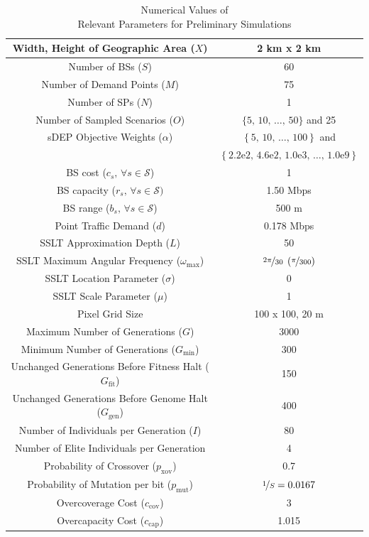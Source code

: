 \documentclass[12pt,dvipsnames]{report}
\newcommand{\expnumber}[2]{{#1}\mathrm{e}{#2}}
\begin{document}
\begin{table}[htp]
\centering
\caption{Numerical Values of\\Relevant Parameters for Preliminary Simulations}
\begin{tabular}{|c|c|} 
\hline
Width, Height of Geographic Area ($X$) & 2 km x 2 km \\
\hline
Number of BSs ($S$) & 60 \\ 
\hline 
Number of Demand Points ($M$) & 75 \\ 
\hline 
Number of SPs ($N$) & 1 \\
\hline
Number of Sampled Scenarios ($O$) & $\{5,\, 10,\, \ldots,\, 50\}$ and 25 \\ 
\hline 
sDEP Objective Weights ($\alpha$) & $\left\{ 5,\, 10,\, \ldots,\, 100 \right\}$ and \\
& $\left\{ \expnumber{2.2}{2},\, \expnumber{4.6}{2},\, \expnumber{1.0}{3},\, \ldots,\, \expnumber{1.0}{9} \right\}$ \\
\hline
BS cost ($c_s,\, \forall s \in \mathcal{S}$) & 1 \\ 
\hline 
BS capacity ($r_s,\, \forall s \in \mathcal{S})$ & 1.50 Mbps \\ 
\hline
BS range ($b_s,\, \forall s \in \mathcal{S}$) & 500 m \\
\hline 
Point Traffic Demand ($d$) & 0.178 Mbps \\ 
\hline 
\hline
SSLT Approximation Depth ($L$) & 50 \\ 
\hline
SSLT Maximum Angular Frequency ($\omega_{\max}$) & $\nicefrac{2 \pi}{30} \; \left( \nicefrac{\pi}{300} \right)$ \\
\hline 
SSLT Location Parameter ($\sigma$) & 0 \\ 
\hline 
SSLT Scale Parameter ($\mu$) & 1 \\ 
\hline
Pixel Grid Size & 100 x 100, 20 m \\
\hline 
\hline
Maximum Number of Generations ($G$) & 3000 \\ 
\hline
Minimum Number of Generations ($G_{\min}$) & 300 \\
\hline
Unchanged Generations Before Fitness Halt ($G_{\text{fit}}$) & 150 \\
\hline 
Unchanged Generations Before Genome Halt ($G_{\text{gen}}$) & 400 \\
\hline 
Number of Individuals per Generation ($I$) & 80 \\ 
\hline
Number of Elite Individuals per Generation & 4 \\
\hline 
Probability of Crossover ($p_\text{xov}$) & 0.7 \\ 
\hline
Probability of Mutation per bit ($p_\text{mut}$) & $\nicefrac{1}{S} = 0.0167$ \\
\hline 
Overcoverage Cost ($c_\text{cov}$) & 3 \\
\hline
Overcapacity Cost ($c_\text{cap}$) & 1.015 \\
\hline
\end{tabular}
\label{tab:Prelim_simval}
\end{table}
\end{document}
